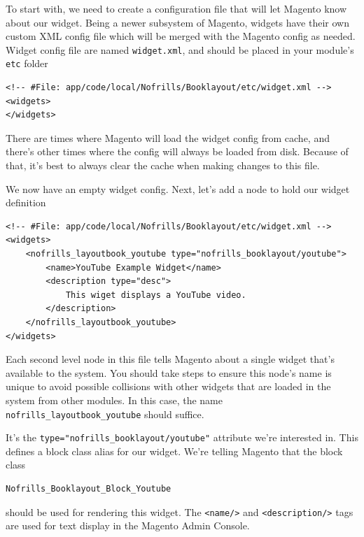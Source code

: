 \documentclass[oneside]{book}
\begin{document}
To start with, we need to create a configuration file that will let Magento know about our widget.  Being a newer subsystem of Magento, widgets have their own custom XML config file which will be merged with the Magento config as needed.  Widget config file are named \footnotesize\texttt{widget.xml}\normalsize, and should be placed in your module's \footnotesize\texttt{etc} \normalsize  folder

\begin{lstlisting}
<!-- #File: app/code/local/Nofrills/Booklayout/etc/widget.xml -->
<widgets>
</widgets>  

\end{lstlisting}


There are times where Magento will load the widget config from cache, and there's other times where the config will always be loaded from disk. Because of that, it's best to always clear the cache when making changes to this file.

We now have an empty widget config.  Next, let's add a node to hold our widget definition

\begin{lstlisting}
<!-- #File: app/code/local/Nofrills/Booklayout/etc/widget.xml -->
<widgets>
    <nofrills_layoutbook_youtube type="nofrills_booklayout/youtube">
        <name>YouTube Example Widget</name>
        <description type="desc">
            This wiget displays a YouTube video.
        </description>
    </nofrills_layoutbook_youtube>
</widgets>  

\end{lstlisting}


Each second level node in this file tells Magento about a single widget that's available to the system.  You should take steps to ensure this node's name is  unique to avoid possible collisions with other widgets that are loaded in the system from other modules. In this case, the name \footnotesize\texttt{nofrills\_layoutbook\_youtube} \normalsize  should suffice.

It's the \footnotesize\texttt{type="nofrills\_booklayout/youtube"} \normalsize  attribute we're interested in.  This defines a block class alias for our widget.  We're telling Magento that the block class

\begin{lstlisting}
Nofrills_Booklayout_Block_Youtube

\end{lstlisting}


should be used for rendering this widget.  The \footnotesize\texttt{\textless name/\textgreater } \normalsize  and \footnotesize\texttt{\textless description/\textgreater } \normalsize  tags are used for text display in the Magento Admin Console.
\end{document}
